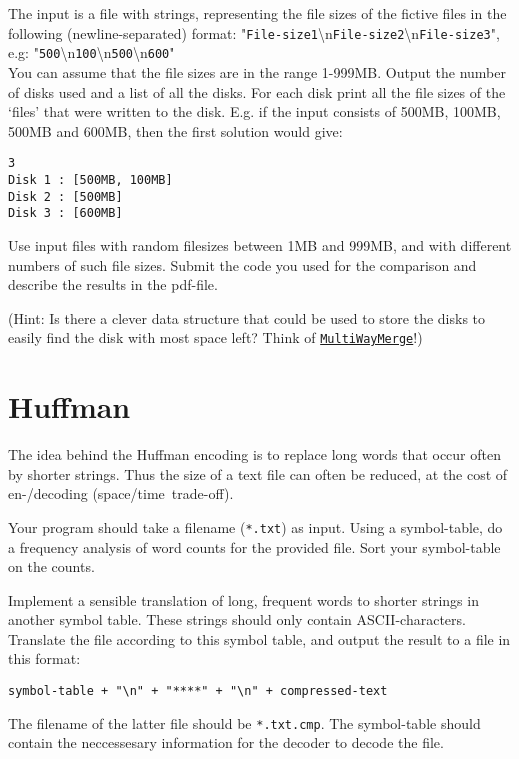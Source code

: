 \documentclass[11pt]{article}
\begin{document}
The input is a file with strings, representing the file sizes of the fictive files in the following (newline-separated) format: "\texttt{File-size1}\textbackslash n\texttt{File-size2}\textbackslash n\texttt{File-size3}", \\
e.g: "\texttt{500}\textbackslash n\texttt{100}\textbackslash n\texttt{500}\textbackslash n\texttt{600}"\\
You can assume that the file sizes are in the range 1-999MB.
Output the number of disks used and a list of all the disks. For each disk print all the file sizes of the `files' that were written to the disk. E.g. if the input consists of 500MB, 100MB, 500MB and 600MB, then the first solution would give:
\begin{lstlisting}[frame=single]
3
Disk 1 : [500MB, 100MB]
Disk 2 : [500MB]
Disk 3 : [600MB]
\end{lstlisting}

Use input files with random filesizes between 1MB and 999MB, and with different numbers of such file sizes. Submit the code you used for the comparison and describe the results in the pdf-file.

(Hint: Is there a clever data structure that could be used to store the disks to easily find the disk with most space left? Think of \href{https://github.com/marcbezem/INF102/blob/master/programs/sorting/priorityQueues/MultiwayMerge.java}{\texttt{MultiWayMerge}}!)


\section*{Huffman}
The idea behind the Huffman encoding is to replace long words that occur often by shorter strings. Thus the size of a text file can often be reduced, at the cost of en-/decoding \mbox{(space/time trade-off)}.

Your program should take a filename (\texttt{*.txt}) as input. Using a symbol-table, do a frequency analysis of word counts for the provided file. Sort your symbol-table on the counts.

Implement a sensible translation of long, frequent words to shorter strings in another symbol table. These strings should only contain ASCII-characters. Translate the file according to this symbol table, and output the result to a file in this format:

\texttt{symbol-table + "\textbackslash n" + "****" + "\textbackslash n" + compressed-text}

The filename of the latter file should be \texttt{*.txt.cmp}. The symbol-table should contain the neccessesary information for the decoder to decode the file.
\end{document}
